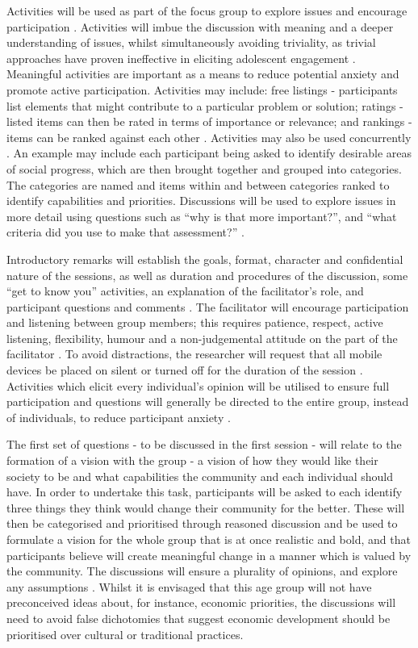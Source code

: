 Activities will be used as part of the focus group to explore issues and encourage participation \citep{Colucci2007}. Activities will imbue the discussion with meaning and a deeper understanding of issues, whilst simultaneously avoiding triviality, as trivial approaches have proven ineffective in eliciting adolescent engagement \citep{Dawes2011}. Meaningful activities are important as a means to reduce potential anxiety and promote active participation. Activities may include: free listings - participants list elements that might contribute to a particular problem or solution; ratings - listed items can then be rated in terms of importance or relevance; and rankings - items can be ranked against each other \citep{Colucci2007}. Activities may also be used concurrently \citep{Colucci2007}. An example may include each participant being asked to identify desirable areas of social progress, which are then brought together and grouped into categories. The categories are named and items within and between categories ranked to identify capabilities and priorities. Discussions will be used to explore issues in more detail using questions such as “why is that more important?”, and “what criteria did you use to make that assessment?” \citep{Colucci2007}. 

Introductory remarks will establish the goals, format, character and confidential nature of the sessions, as well as duration and procedures of the discussion, some “get to know you” activities, an explanation of the facilitator's role, and participant questions and comments \citep{Gibson2007}. The facilitator will encourage participation and listening between group members; this requires patience, respect, active listening, flexibility, humour and a non-judgemental attitude on the part of the facilitator \citep{Gibbs1997,Gibson2007}. To avoid distractions, the researcher will request that all mobile devices be placed on silent or turned off for the duration of the session \citep{Dilorio1994}. Activities which elicit every individual's opinion will be utilised to ensure full participation and questions will generally be directed to the entire group, instead of individuals, to reduce participant anxiety \citep{Gibson2007}.

The first set of questions - to be discussed in the first session - will relate to the formation of a vision with the group - a vision of how they would like their society to be and what capabilities the community and each individual should have. In order to undertake this task, participants will be asked to each identify three things they think would change their community for the better. These will then be categorised and prioritised through reasoned discussion \citep{Sen2009} and be used to formulate a vision for the whole group that is at once realistic and bold, and that participants believe will create meaningful change in a manner which is valued by the community. The discussions will ensure a plurality of opinions, and explore any assumptions \citep{Sen2009,Sen2005}. Whilst it is envisaged that this age group will not have preconceived ideas about, for instance, economic priorities, the discussions will need to avoid false dichotomies that suggest economic development should be prioritised over cultural or traditional practices. 

